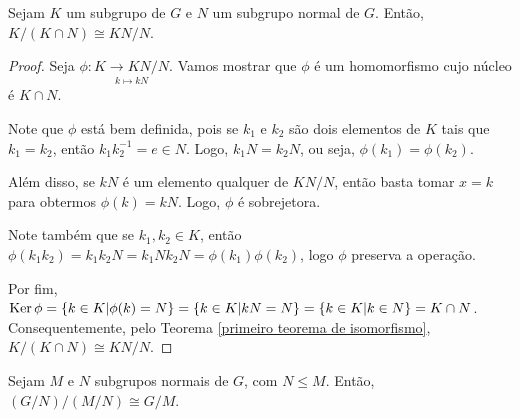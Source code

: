 	
	\begin{theorem}
		\label{segundo teorema de isomorfismos}
		Sejam $K$ um subgrupo de $G$ e $N$ um subgrupo normal de $G$. Então, $K/(K\cap N)\cong KN/N$.
	\end{theorem}
	
	\begin{proof}
		Seja $\phi:\underset{k\mapsto kN}{K\to KN/N}$. Vamos mostrar que $\phi$ é um homomorfismo cujo núcleo é $K\cap N$.
		\par\vspace{0.3cm}
		Note que $\phi$ está bem definida, pois se $k_1$ e $k_2$ são dois elementos de $K$ tais que $k_1=k_2$, então $k_1k_2^{-1} = e\in N$. Logo, $k_1N = k_2N$, ou seja, $\phi(k_1)=\phi(k_2)$.	
		\par\vspace{0.3cm}
		Além disso, se $kN$ é um elemento qualquer de $KN/N$, então basta tomar $x=k$ para obtermos $\phi(k)=kN$. Logo, $\phi$ é sobrejetora. 	
		\par\vspace{0.3cm}
		Note também que se $k_1,k_2\in K$, então $\phi(k_1k_2)=k_1k_2N=k_1Nk_2N=\phi(k_1)\phi(k_2)$, logo $\phi$ preserva a operação.	
		\par\vspace{0.3cm}
		Por fim, $\operatorname{Ker}\phi= \{ k\in K | \phi(k) = N \} = \{ k\in K | kN = N \}= \{ k\in K | k\in N \} = K\cap N$. Consequentemente, pelo Teorema \eqref{primeiro teorema de isomorfismo},  $K/(K\cap N)\cong KN/N$.  
	\end{proof}
	
	\par\vspace{0.3cm}
	
	\begin{theorem}
		\label{terceiro teorema de isomorfismos}
		Sejam $M$ e $N$ subgrupos normais de $G$, com $N\leq M$. Então, $(G/N)/(M/N)\cong G/M$.
	\end{theorem}
	
